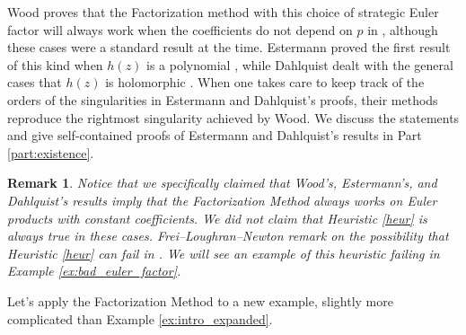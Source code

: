 \documentclass[12pt]{amsart}
\newtheorem{remark}[theorem]{Remark}
\theoremstyle{plain}
\begin{document}
Wood proves that the Factorization method with this choice of strategic Euler factor will always work when the coefficients do not depend on $p$ in \cite[Lemma 2.12]{wood2009}, although these cases were a standard result at the time. Estermann proved the first result of this kind when $h(z)$ is a polynomial \cite{estermann_1928}, while Dahlquist dealt with the general cases that $h(z)$ is holomorphic \cite{dahlquist_1952}. When one takes care to keep track of the orders of the singularities in Estermann and Dahlquist's proofs, their methods reproduce the rightmost singularity achieved by Wood. We discuss the statements and give self-contained proofs of Estermann and Dahlquist's results in Part \ref{part:existence}.

\begin{remark}
    Notice that we specifically claimed that Wood's, Estermann's, and Dahlquist's results imply that the Factorization Method always works on Euler products with constant coefficients. We \emph{did not} claim that Heuristic \ref{heur} is always true in these cases. Frei--Loughran--Newton remark on the possibility that Heuristic \ref{heur} can fail in \cite[Remark 2.4]{frei-loughran-newton2019}. We will see an example of this heuristic failing in Example \ref{ex:bad_euler_factor}.
\end{remark}

Let's apply the Factorization Method to a new example, slightly more complicated than Example \ref{ex:intro_expanded}.
\end{document}
